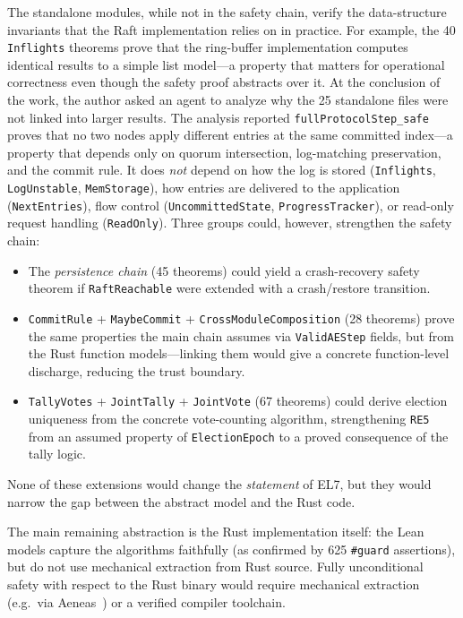 \documentclass[sigconf,10pt]{acmart}
\begin{document}
The standalone modules, while not in the safety chain, verify the
data-structure invariants that the Raft implementation relies on in
practice.  For example, the 40 \texttt{Inflights} theorems prove that
the ring-buffer implementation computes identical results to a simple
list model---a property that matters for operational correctness even
though the safety proof abstracts over it. At the conclusion of the work, the author asked an agent to analyze why
the 25 standalone files were not linked into larger results. The analysis
reported \texttt{fullProtocolStep\_safe} proves that no two nodes apply
different entries at the same committed index---a property that depends
only on quorum intersection, log-matching preservation, and the commit
rule.  It does \emph{not} depend on how the log is stored
(\texttt{Inflights}, \texttt{LogUnstable}, \texttt{MemStorage}), how
entries are delivered to the application (\texttt{NextEntries}), flow
control (\texttt{UncommittedState}, \texttt{ProgressTracker}), or
read-only request handling (\texttt{ReadOnly}).  Three groups could,
however, strengthen the safety chain:

\begin{itemize}\setlength\itemsep{0pt}
\item The \emph{persistence chain} (45 theorems) could yield a
  crash-recovery safety theorem if \texttt{RaftReachable} were extended
  with a crash/restore transition.
\item \texttt{CommitRule} + \texttt{MaybeCommit} +
  \texttt{CrossModuleComposition} (28 theorems) prove the same properties
  the main chain assumes via \texttt{ValidAEStep} fields, but from the
  Rust function models---linking them would give a concrete function-level
  discharge, reducing the trust boundary.
\item \texttt{TallyVotes} + \texttt{JointTally} + \texttt{JointVote}
  (67 theorems) could derive election uniqueness from the concrete
  vote-counting algorithm, strengthening \texttt{RE5} from an assumed
  property of \texttt{ElectionEpoch} to a proved consequence of the
  tally logic.
\end{itemize}

\noindent None of these extensions would change the \emph{statement} of EL7, but
they would narrow the gap between the abstract model and the Rust code.

The main remaining abstraction is the Rust implementation itself:
the Lean models capture the algorithms faithfully (as confirmed by
625 \texttt{\#guard} assertions), but do not use mechanical extraction
from Rust source.  Fully unconditional safety with respect to the
Rust binary would require mechanical extraction (e.g.\ via
Aeneas~\cite{aeneas}) or a verified compiler toolchain.
\end{document}
